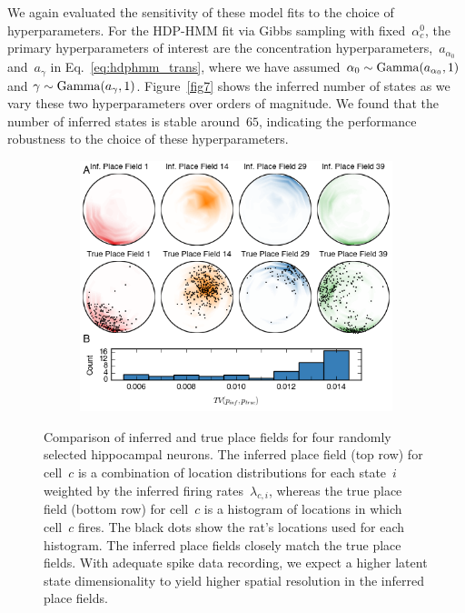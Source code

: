 We again evaluated the sensitivity of these model fits to the choice
of hyperparameters. For the HDP-HMM fit via Gibbs sampling with
fixed~$\alpha_c^0$, the primary hyperparameters of interest are the
concentration hyperparameters,~$a_{\alpha_0}$ and~$a_{\gamma}$ in
Eq.~\ref{eq:hdphmm_trans}, where we have assumed $ \alpha_0 \sim
\mathrm{Gamma}(a_{\alpha_0}, 1)$ and $ \gamma \sim \mathrm{Gamma}(a_\gamma, 1)
$.  Figure~\ref{fig7} shows the inferred number of states as we vary
these two hyperparameters over orders of magnitude. We found that the
number of inferred states is stable around~$65$, indicating the
performance robustness to the choice of these hyperparameters.

\begin{figure}
  \centering
  \begin{subfigure}[t]{5in}
    \includegraphics[width=\textwidth]{figures/ch5/Fig8}
  \end{subfigure}
  \caption[True and inferred place field comparison]{Comparison of
    inferred and true place fields for four randomly selected
    hippocampal neurons. The inferred place field (top row) for
    cell~$c$ is a combination of location distributions for each
    state~$i$ weighted by the inferred firing rates~$\lambda_{c,i}$,
    whereas the true place field (bottom row) for cell~$c$ is a
    histogram of locations in which cell~$c$ fires. The black dots
    show the rat's locations used for each histogram. The inferred
    place fields closely match the true place fields. With adequate
    spike data recording, we expect a higher latent state
    dimensionality to yield higher spatial resolution in the inferred
    place fields.}
  \label{fig8}
\end{figure}

